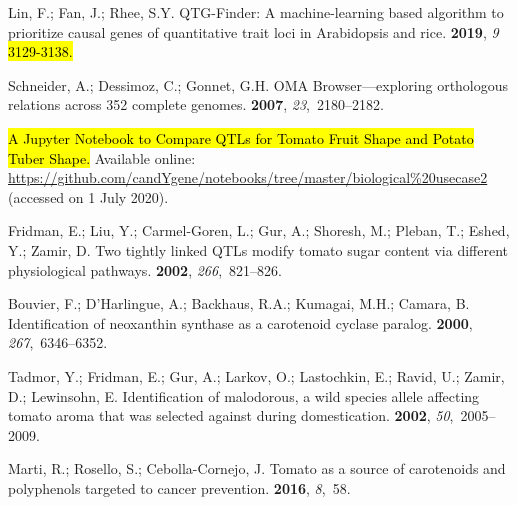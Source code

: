 \documentclass[applsci,article,accept,moreauthors,pdftex]{Definitions/mdpi}
\begin{document}
{\begin{thebibliography}{999}
{
Lin, F.; Fan, J.; Rhee, S.Y.
\newblock QTG-Finder: A machine-learning based algorithm to prioritize causal
  genes of quantitative trait loci in Arabidopsis and rice.
 {\bf 2019}, {\em 9} \hl{3129-3138.} %


Schneider, A.; Dessimoz, C.; Gonnet, G.H.
\newblock OMA Browser—exploring orthologous relations across 352 complete
  genomes.
 {\bf 2007}, {\em 23},~2180--2182.

\hl{A Jupyter Notebook to Compare QTLs for Tomato Fruit Shape and Potato Tuber
  Shape.} %
\newblock Available online:  
  \url{https://github.com/candYgene/notebooks/tree/master/biological\%20usecase2}
\newblock (accessed on 1 July 2020).

Fridman, E.; Liu, Y.; Carmel-Goren, L.; Gur, A.; Shoresh, M.; Pleban, T.;
  Eshed, Y.; Zamir, D.
\newblock Two tightly linked QTLs modify tomato sugar content via different
  physiological pathways.
 {\bf 2002}, {\em
  266},~821--826.

Bouvier, F.; D’Harlingue, A.; Backhaus, R.A.; Kumagai, M.H.; Camara, B.
\newblock Identification of neoxanthin synthase as a carotenoid cyclase
  paralog.
 {\bf 2000}, {\em
  267},~6346--6352.

Tadmor, Y.; Fridman, E.; Gur, A.; Larkov, O.; Lastochkin, E.; Ravid, U.; Zamir,
  D.; Lewinsohn, E.
\newblock Identification of malodorous, a wild species allele affecting tomato
  aroma that was selected against during domestication.
 {\bf 2002}, {\em
  50},~2005--2009.

Marti, R.; Rosello, S.; Cebolla-Cornejo, J.
\newblock Tomato as a source of carotenoids and polyphenols targeted to cancer
  prevention.
 {\bf 2016}, {\em 8},~58.

}
\end{thebibliography}}
\end{document}
